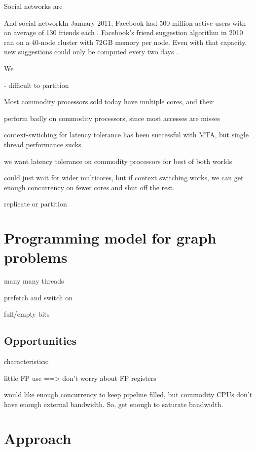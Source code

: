 \documentclass{acm_proc_article-sp}
\begin{document}
Social networks are 

And social networkIn January 2011, Facebook had 500 million active users with an
average of 130 friends each \cite{Facebook:2011p91}. Facebook's
friend suggestion algorithm in 2010 ran on a 40-node cluster with 72GB
memory per node. Even with that capacity, new suggestions could only
be computed every two days \cite{Backstrom:2010p90}.

We


- difficult to partition




Most commodity processors sold today have multiple cores, and their 


perform badly on commodity processors, since most accesses are misses

context-swtiching for latency tolerance has been successful with MTA, but single thread performance sucks

we want latency tolerance on commodity processors for best of both worlds

could just wait for wider multicores, but if context switching works,
we can get enough concurrency on fewer cores and shut off the rest.


replicate or partition

\section{Programming model for graph problems}

many many threads

prefetch and switch on 

full/empty bits 

\subsection{Opportunities}

characteristics:



little FP use ==> don't worry about FP registers

would like enough concurrency to keep pipeline filled, but commodity CPUs don't have enough external bandwidth. So, get enough to saturate bandwidth.



\section{Approach}
\end{document}
